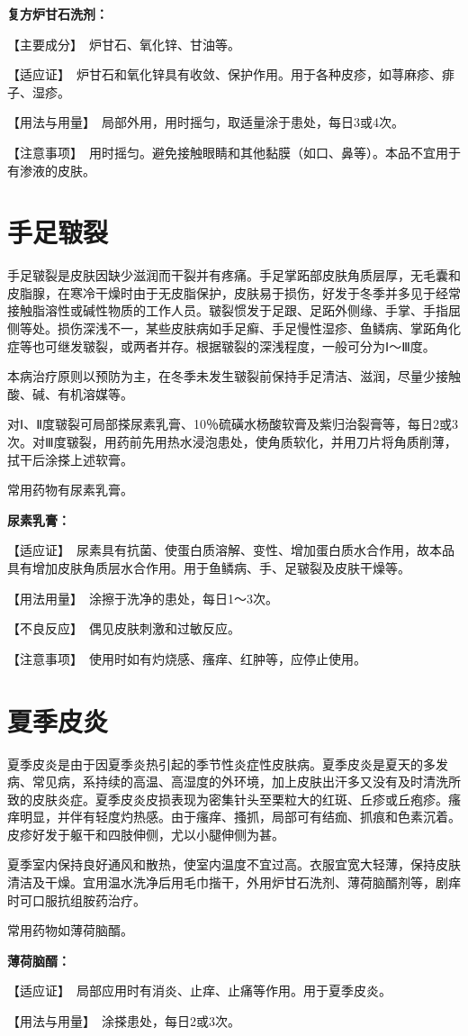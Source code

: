 \textbf{复方炉甘石洗剂：}

【主要成分】　炉甘石、氧化锌、甘油等。

【适应证】　炉甘石和氧化锌具有收敛、保护作用。用于各种皮疹，如荨麻疹、痱子、湿疹。

【用法与用量】　局部外用，用时摇匀，取适量涂于患处，每日3或4次。

【注意事项】　用时摇匀。避免接触眼睛和其他黏膜（如口、鼻等）。本品不宜用于有渗液的皮肤。

\section{手足皲裂}

手足皲裂是皮肤因缺少滋润而干裂并有疼痛。手足掌跖部皮肤角质层厚，无毛囊和皮脂腺，在寒冷干燥时由于无皮脂保护，皮肤易于损伤，好发于冬季并多见于经常接触脂溶性或碱性物质的工作人员。皲裂惯发于足跟、足跖外侧缘、手掌、手指屈侧等处。损伤深浅不一，某些皮肤病如手足癣、手足慢性湿疹、鱼鳞病、掌跖角化症等也可继发皲裂，或两者并存。根据皲裂的深浅程度，一般可分为Ⅰ～Ⅲ度。

本病治疗原则以预防为主，在冬季未发生皲裂前保持手足清洁、滋润，尽量少接触酸、碱、有机溶媒等。

对Ⅰ、Ⅱ度皲裂可局部搽尿素乳膏、10％硫磺水杨酸软膏及紫归治裂膏等，每日2或3次。对Ⅲ度皲裂，用药前先用热水浸泡患处，使角质软化，并用刀片将角质削薄，拭干后涂搽上述软膏。

常用药物有尿素乳膏。

\textbf{尿素乳膏：}

【适应证】　尿素具有抗菌、使蛋白质溶解、变性、增加蛋白质水合作用，故本品具有增加皮肤角质层水合作用。用于鱼鳞病、手、足皲裂及皮肤干燥等。

【用法用量】　涂擦于洗净的患处，每日1～3次。

【不良反应】　偶见皮肤刺激和过敏反应。

【注意事项】　使用时如有灼烧感、瘙痒、红肿等，应停止使用。

\section{夏季皮炎}

夏季皮炎是由于因夏季炎热引起的季节性炎症性皮肤病。夏季皮炎是夏天的多发病、常见病，系持续的高温、高湿度的外环境，加上皮肤出汗多又没有及时清洗所致的皮肤炎症。夏季皮炎皮损表现为密集针头至栗粒大的红斑、丘疹或丘疱疹。瘙痒明显，并伴有轻度灼热感。由于瘙痒、搔抓，局部可有结痂、抓痕和色素沉着。皮疹好发于躯干和四肢伸侧，尤以小腿伸侧为甚。

夏季室内保持良好通风和散热，使室内温度不宜过高。衣服宜宽大轻薄，保持皮肤清洁及干燥。宜用温水洗净后用毛巾揩干，外用炉甘石洗剂、薄荷脑醑剂等，剧痒时可口服抗组胺药治疗。

常用药物如薄荷脑醑。

\textbf{薄荷脑醑：}

【适应证】　局部应用时有消炎、止痒、止痛等作用。用于夏季皮炎。

【用法与用量】　涂搽患处，每日2或3次。